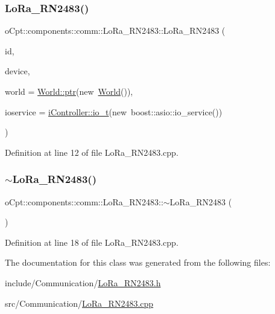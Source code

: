 \subsubsection{\texorpdfstring{Lo\+Ra\+\_\+\+R\+N2483()}{LoRa\_RN2483()}}
{\footnotesize\ttfamily o\+Cpt\+::components\+::comm\+::\+Lo\+Ra\+\_\+\+R\+N2483\+::\+Lo\+Ra\+\_\+\+R\+N2483 (\begin{DoxyParamCaption}\item[{const std\+::string \&}]{id,  }\item[{const std\+::string \&}]{device,  }\item[{\hyperlink{classo_cpt_1_1_world_aa6e591e3096d5de71e0cec9039663d67}{World\+::ptr}}]{world = {\ttfamily \hyperlink{classo_cpt_1_1_world_aa6e591e3096d5de71e0cec9039663d67}{World\+::ptr}(new~\hyperlink{classo_cpt_1_1_world}{World}())},  }\item[{\hyperlink{classo_cpt_1_1i_controller_a51c3436b03060209f6cd2ddce6df2d0c}{i\+Controller\+::io\+\_\+t}}]{ioservice = {\ttfamily \hyperlink{classo_cpt_1_1i_controller_a51c3436b03060209f6cd2ddce6df2d0c}{i\+Controller\+::io\+\_\+t}(new~boost\+:\+:asio\+:\+:io\+\_\+service())} }\end{DoxyParamCaption})}



Definition at line 12 of file Lo\+Ra\+\_\+\+R\+N2483.\+cpp.

\hypertarget{classo_cpt_1_1components_1_1comm_1_1_lo_ra___r_n2483_a30d55c900718ac38d0207c6f678ca96c}{}\label{classo_cpt_1_1components_1_1comm_1_1_lo_ra___r_n2483_a30d55c900718ac38d0207c6f678ca96c} 
\subsubsection{\texorpdfstring{$\sim$\+Lo\+Ra\+\_\+\+R\+N2483()}{~LoRa\_RN2483()}}
{\footnotesize\ttfamily o\+Cpt\+::components\+::comm\+::\+Lo\+Ra\+\_\+\+R\+N2483\+::$\sim$\+Lo\+Ra\+\_\+\+R\+N2483 (\begin{DoxyParamCaption}{ }\end{DoxyParamCaption})\hspace{0.3cm}{\ttfamily [virtual]}}



Definition at line 18 of file Lo\+Ra\+\_\+\+R\+N2483.\+cpp.



The documentation for this class was generated from the following files\+:\begin{DoxyCompactItemize}
\item 
include/\+Communication/\hyperlink{_lo_ra___r_n2483_8h}{Lo\+Ra\+\_\+\+R\+N2483.\+h}\item 
src/\+Communication/\hyperlink{_lo_ra___r_n2483_8cpp}{Lo\+Ra\+\_\+\+R\+N2483.\+cpp}\end{DoxyCompactItemize}
